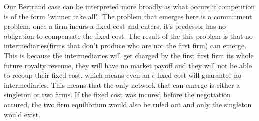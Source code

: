 \documentclass{article}
\begin{document}
Our Bertrand case can be interpreted more broadly as what occurs if competition is of the form "winner take all". The problem that emerges here is a commitment problem, once a firm incurs a fixed cost and enters, it's predessor has no obligation to compensate the fixed cost. The result of the this problem is that no intermediaries(firms that don't produce who are not the first firm) can emerge. This is because the intermediaries will get charged by the first first firm its whole future royalty revenue, they will have no market payoff and they will not be able to recoup their fixed cost, which means even an $\epsilon$ fixed cost will guarantee no intermediaries. This means that the only network that can emerge is either a singleton or two firms. If the fixed cost was incured before the negotiation occured, the two firm equilibrium would also be ruled out and only the singleton would exist. 


\end{document}
